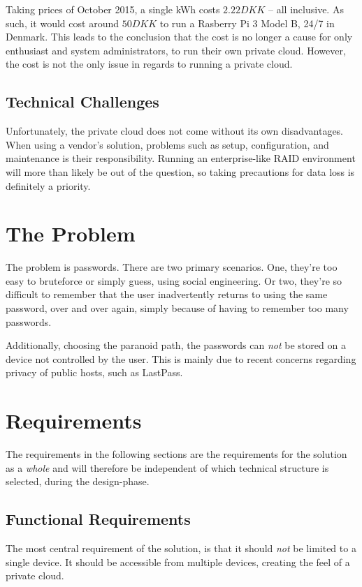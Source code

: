 			Taking prices of October 2015, a single kWh costs $2.22DKK$ \cite{energi_price} -- all inclusive. As such, it would cost around $50DKK$ to run a Rasberry Pi 3 Model B, 24/7 in Denmark. This leads to the conclusion that the cost is no longer a cause for only enthusiast and system administrators, to run their own private cloud. However, the cost is not the only issue in regards to running a private cloud.


		\subsection*{Technical Challenges}
			Unfortunately, the private cloud does not come without its own disadvantages. When using a vendor's solution, problems such as setup, configuration, and maintenance is their responsibility. Running an enterprise-like RAID environment will more than likely be out of the question, so taking precautions for data loss is definitely a priority.







	\section{The Problem}
		\label{chap:intro_sec:problem}
		The problem is passwords. There are two primary scenarios. One, they're too easy to bruteforce or simply guess, using social engineering. Or two, they're so difficult to remember that the user inadvertently returns to using the same password, over and over again, simply because of having to remember too many passwords. 

		Additionally, choosing the paranoid path, the passwords can \emph{not} be stored on a device not controlled by the user. This is mainly due to recent concerns regarding privacy of public hosts, such as LastPass.





	\section{Requirements}
		\label{sec:requirements}
		The requirements in the following sections are the requirements for the solution as a \emph{whole} and will therefore be independent of which technical structure is selected, during the design-phase.



		\subsection*{Functional Requirements}
			The most central requirement of the solution, is that it should \emph{not} be limited to a single device. It should be accessible from multiple devices, creating the feel of a private cloud. 

